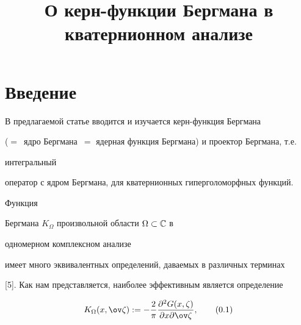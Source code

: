 

\title{О керн-функции Бергмана в кватернионном анализе}  


  


\date{}  




  


\pagestyle{plain} %


  


  




  


\maketitle  


 


\section*{Введение} 


 


В предлагаемой статье вводится и изучается керн-функция Бергмана 


($=$~ядро Бергмана~$=$ ядерная функция Бергмана) и проектор Бергмана, т.е. 


интегральный 


оператор с ядром Бергмана, для кватернионных гиперголоморфных функций. 


Функция 


Бергмана $K_\Omega$ произвольной области $\Omega\subset\Bbb C$ в 


одномерном комплексном анализе 


имеет много эквивалентных определений, даваемых в различных терминах 


[5]. Как нам представляется, наиболее эффективным является определение 


\begin{equation} 


K_\Omega(x,\ov\zeta):=-\frac{2}{\pi} 


\frac{\partial^2 G(x,\zeta)}{\partial x\partial\ov\zeta}, 


\tag{0.1} 


\end{equation} 


